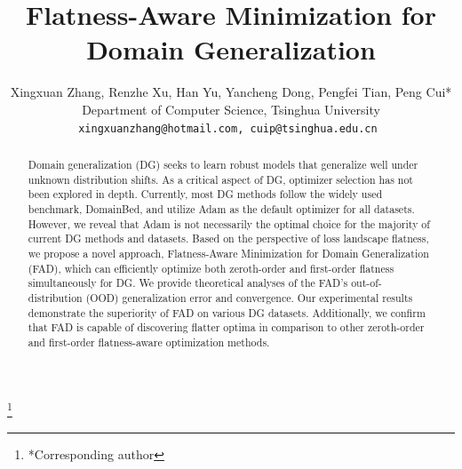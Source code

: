 \documentclass[10pt,twocolumn,letterpaper]{article}
\theoremstyle{definition}
\newcommand\blfootnote[1]{%
  \begingroup
  \renewcommand\thefootnote{}\footnote{#1}%
  \addtocounter{footnote}{-1}%
  \endgroup
}
\begin{document}
\title{Flatness-Aware Minimization for Domain Generalization}

\author{Xingxuan Zhang, Renzhe Xu, Han Yu, Yancheng Dong, Pengfei Tian, Peng Cui*\\
Department of Computer Science, Tsinghua University\\
{\tt\small {xingxuanzhang@hotmail.com, cuip@tsinghua.edu.cn 
}}}
\maketitle

\begin{abstract}
Domain generalization (DG) seeks to learn robust models that generalize well under unknown distribution shifts. 
As a critical aspect of DG, 
optimizer selection has not been explored in depth. 
Currently, most DG methods follow the widely used benchmark, DomainBed, and utilize Adam as the default optimizer for all datasets. However, we reveal that Adam is not necessarily the optimal choice for the majority of current DG methods and datasets. Based on the perspective of loss landscape flatness, we propose a novel approach, Flatness-Aware Minimization for Domain Generalization (FAD), which can efficiently optimize both zeroth-order and first-order flatness simultaneously for DG. We provide theoretical analyses of the FAD's out-of-distribution (OOD) generalization error and convergence. Our experimental results demonstrate the superiority of FAD on various DG datasets. Additionally, we confirm that FAD is capable of discovering flatter optima in comparison to other zeroth-order and first-order flatness-aware optimization methods.


\end{abstract}

\blfootnote{*Corresponding author}







{\small


}

\clearpage
\onecolumn

\appendix


% 
% 
% 
\end{document}
